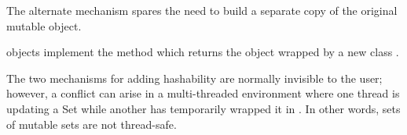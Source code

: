 The alternate mechanism spares the need to build a separate copy of
the original mutable object.

 objects implement the 
method which returns the  object wrapped by a new class
.

The two mechanisms for adding hashability are normally invisible to the
user; however, a conflict can arise in a multi-threaded environment
where one thread is updating a Set while another has temporarily wrapped it
in .  In other words, sets of mutable sets
are not thread-safe.
